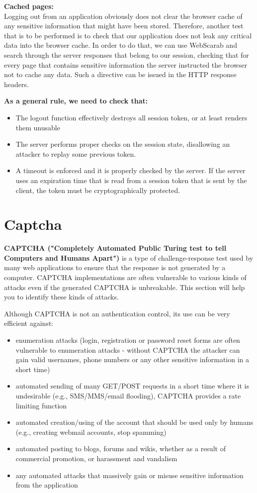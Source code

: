 	{\bf Cached pages:} \\
	Logging out from an application obviously does not clear the browser cache of any sensitive 
	information that might have been stored. Therefore, another test that is to be performed is to 
	check that our application does not leak any critical data into the browser cache. In order to 
	do that, we can use WebScarab and search through the server responses that belong to our session,
	checking that for every page that contains sensitive information the server instructed the browser 
	not to cache any data. Such a directive can be issued in the HTTP response headers. 

	{\bf As a general rule, we need to check that:}
		\begin{itemize}
			\item The logout function effectively destroys all session token, or at least renders 
			them unusable
			\item The server performs proper checks on the session state, disallowing an attacker 
			to replay some previous token.
			\item A timeout is enforced and it is properly checked by the server. If the server 
			uses an expiration time that is read from a session token that is sent by the client, 
			the token must be cryptographically protected.
		\end{itemize}

\section{Captcha}
	{\bf CAPTCHA ("Completely Automated Public Turing test to tell Computers and Humans Apart")} is a
	type of challenge-response test used by many web applications to ensure that the response is not
	generated by a computer. CAPTCHA implementations are often vulnerable to various kinds of attacks 
	even if the generated CAPTCHA is unbreakable. This section will help you to identify these kinds 
	of attacks.

	Although CAPTCHA is not an authentication control, its use can be very efficient against:
		\begin{itemize}
			\item enumeration attacks (login, registration or password reset forms are often vulnerable 
			to enumeration attacks - without CAPTCHA the attacker can gain valid usernames, phone numbers 
			or any other sensitive information in a short time)
			\item automated sending of many GET/POST requests in a short time where it is undesirable 
			(e.g., SMS/MMS/email flooding), CAPTCHA provides a rate limiting function
			\item automated creation/using of the account that should be used only by humans 
			(e.g., creating webmail accounts, stop spamming)
			\item automated posting to blogs, forums and wikis, whether as a result of commercial 
			promotion, or harassment and vandalism
			\item any automated attacks that massively gain or misuse sensitive information from 
			the application
		\end{itemize}

